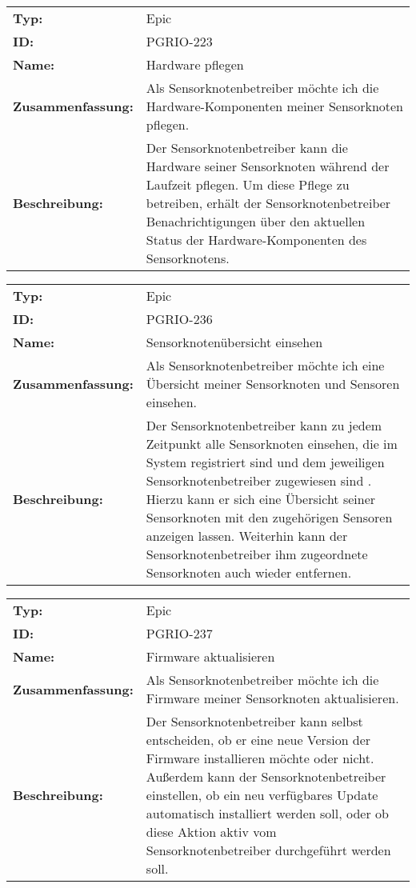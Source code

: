 		\begin{flushleft} 
\begin{tabular}{@{}lp{100mm}} 
\textbf{Typ:} & Epic \\ 
\textbf{ID:} & PGRIO-223 \\ 
\textbf{Name:} & Hardware pflegen \\ 
\textbf{Zusammenfassung:} & Als Sensorknotenbetreiber möchte ich die Hardware-Komponenten meiner Sensorknoten pflegen. \\ 
\textbf{Beschreibung:} & Der Sensorknotenbetreiber kann die Hardware seiner Sensorknoten während der Laufzeit pflegen. Um diese Pflege zu betreiben, erhält der Sensorknotenbetreiber Benachrichtigungen über den aktuellen Status der Hardware-Komponenten des Sensorknotens. \\ 
\end{tabular} 
\end{flushleft} 

		\begin{flushleft} 
\begin{tabular}{@{}lp{100mm}} 
\textbf{Typ:} & Epic \\ 
\textbf{ID:} & PGRIO-236 \\ 
\textbf{Name:} & Sensorknotenübersicht einsehen \\ 
\textbf{Zusammenfassung:} & Als Sensorknotenbetreiber möchte ich eine Übersicht meiner Sensorknoten und Sensoren einsehen. \\ 
\textbf{Beschreibung:} & Der Sensorknotenbetreiber kann zu jedem Zeitpunkt alle Sensorknoten einsehen, die im System registriert sind und dem jeweiligen Sensorknotenbetreiber zugewiesen sind . Hierzu kann er sich eine Übersicht seiner Sensorknoten mit den zugehörigen Sensoren anzeigen lassen. Weiterhin kann der Sensorknotenbetreiber ihm zugeordnete Sensorknoten auch wieder entfernen. \\ 
\end{tabular} 
\end{flushleft} 

		\begin{flushleft} 
\begin{tabular}{@{}lp{100mm}} 
\textbf{Typ:} & Epic \\ 
\textbf{ID:} & PGRIO-237 \\ 
\textbf{Name:} & Firmware aktualisieren \\ 
\textbf{Zusammenfassung:} & Als Sensorknotenbetreiber möchte ich die Firmware meiner Sensorknoten aktualisieren. \\ 
\textbf{Beschreibung:} & Der Sensorknotenbetreiber kann selbst entscheiden, ob er eine neue Version der Firmware installieren möchte oder nicht. Außerdem kann der Sensorknotenbetreiber einstellen, ob ein neu verfügbares Update automatisch installiert werden soll, oder ob diese Aktion aktiv vom Sensorknotenbetreiber durchgeführt werden soll. \\ 
\end{tabular} 
\end{flushleft} 

